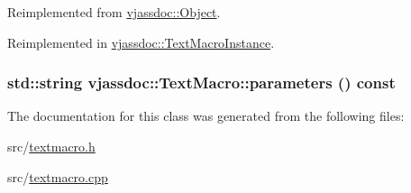 Reimplemented from \hyperlink{classvjassdoc_1_1Object_4e8ebbb0ce5b0bf91ec847b1e4a9f8fc}{vjassdoc::Object}.

Reimplemented in \hyperlink{classvjassdoc_1_1TextMacroInstance_7659e7ac5ff7547dfc526a4a7ff152b5}{vjassdoc::TextMacroInstance}.\hypertarget{classvjassdoc_1_1TextMacro_33859a2be0f2da7633863fd06185f040}{
\subsubsection{\setlength{\rightskip}{0pt plus 5cm}std::string vjassdoc::TextMacro::parameters () const}}
\label{classvjassdoc_1_1TextMacro_33859a2be0f2da7633863fd06185f040}




The documentation for this class was generated from the following files:\begin{CompactItemize}
\item 
src/\hyperlink{textmacro_8h}{textmacro.h}\item 
src/\hyperlink{textmacro_8cpp}{textmacro.cpp}\end{CompactItemize}
